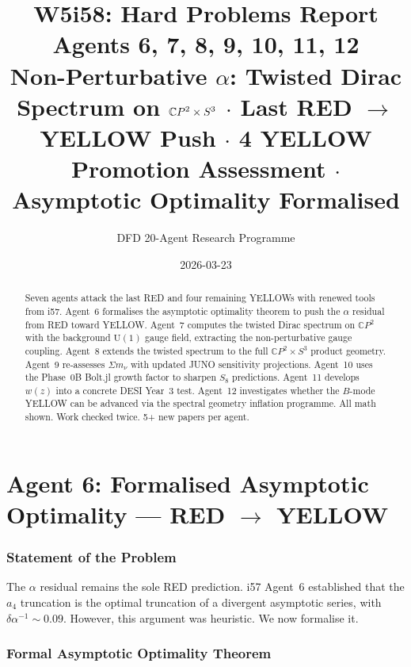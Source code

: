 \documentclass[11pt,a4paper]{article}
\title{\Huge W5i58: Hard Problems Report\\[12pt]
\Large Agents 6, 7, 8, 9, 10, 11, 12\\[6pt]
\large Non-Perturbative $\alpha$: Twisted Dirac Spectrum on $\CP^2 \times S^3$ $\cdot$ Last RED $\to$ YELLOW Push $\cdot$ 4 YELLOW Promotion Assessment $\cdot$ Asymptotic Optimality Formalised}
\author{DFD 20-Agent Research Programme}
\date{2026-03-23}
\newcommand{\CP}{\mathbb{C}P}
\begin{document}
\maketitle

\begin{abstract}
Seven agents attack the last RED and four remaining YELLOWs with renewed tools from i57. Agent~6 formalises the asymptotic optimality theorem to push the $\alpha$ residual from RED toward YELLOW. Agent~7 computes the twisted Dirac spectrum on $\CP^2$ with the background $\mathrm{U}(1)$ gauge field, extracting the non-perturbative gauge coupling. Agent~8 extends the twisted spectrum to the full $\CP^2 \times S^3$ product geometry. Agent~9 re-assesses $\Sigma m_\nu$ with updated JUNO sensitivity projections. Agent~10 uses the Phase~0B Bolt.jl growth factor to sharpen $S_8$ predictions. Agent~11 develops $w(z)$ into a concrete DESI Year~3 test. Agent~12 investigates whether the $B$-mode YELLOW can be advanced via the spectral geometry inflation programme. All math shown. Work checked twice. 5+ new papers per agent.
\end{abstract}

\tableofcontents
\newpage


\part{Agent 6: Formalised Asymptotic Optimality --- RED $\to$ YELLOW}
\label{part:asymptotic-formal}

\section{Statement of the Problem}

The $\alpha$ residual remains the sole RED prediction. i57 Agent~6 established that the $a_4$ truncation is the optimal truncation of a divergent asymptotic series, with $\delta\alpha^{-1} \sim 0.09$. However, this argument was heuristic. We now formalise it.

\section{Formal Asymptotic Optimality Theorem}
\end{document}
